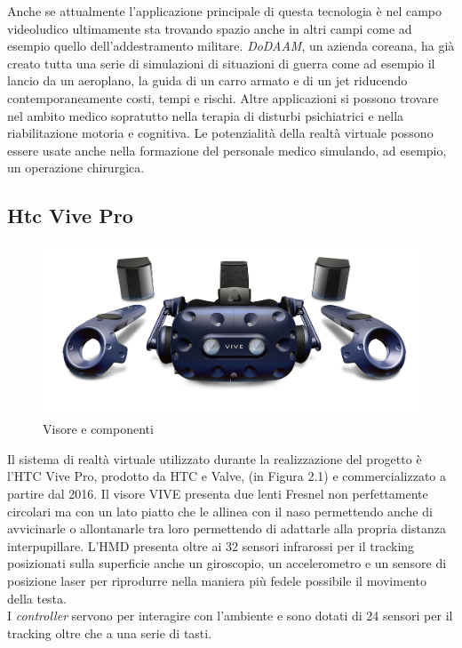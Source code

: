 Anche se attualmente l'applicazione principale di questa tecnologia è nel campo videoludico ultimamente sta trovando spazio anche in altri campi come ad esempio quello dell'addestramento militare. \textit{DoDAAM}, un azienda coreana, ha già creato tutta una serie di simulazioni di situazioni di guerra come ad esempio il lancio da un aeroplano, la guida di un carro armato e di un jet riducendo contemporaneamente costi, tempi e rischi. Altre applicazioni si possono trovare nel ambito medico sopratutto nella terapia di disturbi psichiatrici e nella riabilitazione motoria e cognitiva. Le potenzialità della realtà virtuale possono essere usate anche nella formazione del personale medico simulando, ad esempio, un operazione chirurgica.	
\subsection{Htc Vive Pro}
\begin{figure}[h!]
	\centering
	\includegraphics[width=1\linewidth]{../immagini/vive}
	\caption[Htc Vive]{Visore e componenti }
	\label{fig:vive}
\end{figure}
Il sistema di realtà virtuale utilizzato durante la realizzazione del progetto è l'HTC Vive Pro, prodotto da HTC e Valve, (in Figura 2.1) e commercializzato a partire dal 2016. Il visore VIVE presenta due lenti Fresnel non perfettamente circolari ma con un lato piatto che le allinea con il naso permettendo anche di avvicinarle o allontanarle tra loro permettendo di adattarle alla propria distanza interpupillare. L'HMD presenta oltre ai 32 sensori infrarossi per il tracking posizionati sulla superficie anche un giroscopio, un accelerometro e un sensore di posizione laser per riprodurre nella maniera più fedele possibile il movimento della testa.\\
I \textit{controller} servono per interagire con l'ambiente e sono dotati di 24 sensori per il tracking oltre che a una serie di tasti.\\

